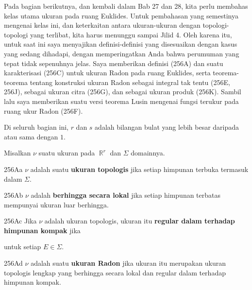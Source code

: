 
\def\chaptername{Ukuran produk}
\def\sectionname{Ukuran Radon pada $\BbbR^r$}


\def\headlinesectionname{Ukuran Radon pada {$\eightBbb R^r$}}

Pada bagian berikutnya, dan kembali dalam Bab 27 dan 28,
kita perlu membahas kelas utama ukuran pada ruang Euklides.
Untuk pembahasan yang semestinya mengenai kelas ini, dan keterkaitan
antara ukuran-ukuran dengan topologi-topologi yang terlibat, kita harus menunggu sampai
Jilid 4.   Oleh karena itu, untuk saat ini saya menyajikan definisi-definisi yang disesuaikan dengan
kasus yang sedang dihadapi, dengan memperingatkan Anda bahwa perumuman yang tepat tidak
sepenuhnya jelas.   Saya memberikan definisi (256A) dan suatu karakterisasi
(256C) untuk ukuran Radon pada ruang Euklides, serta teorema-teorema tentang
konstruksi
ukuran Radon sebagai integral tak tentu (256E, 256J), sebagai ukuran citra
(256G), dan sebagai ukuran produk (256K).   Sambil lalu saya memberikan suatu versi
teorema Lusin mengenai fungsi terukur pada ruang ukur Radon
(256F).

Di seluruh bagian ini, $r$ dan $s$ adalah bilangan bulat yang lebih besar daripada atau sama
dengan $1$.

 Misalkan $\nu$ suatu ukuran pada $\BbbR^r$
dan $\Sigma$ domainnya.

\spheader 256Aa $\nu$ adalah suatu {\bf ukuran topologis} jika setiap himpunan terbuka
termasuk dalam $\Sigma$.   

\spheader 256Ab $\nu$ adalah {\bf berhingga secara lokal} jika setiap himpunan terbatas mempunyai
ukuran luar berhingga.

\spheader 256Ac Jika $\nu$ adalah ukuran topologis, ukuran itu {\bf regular
dalam terhadap himpunan kompak} jika


\noindent untuk setiap $E\in\Sigma$.   

\spheader 256Ad $\nu$ adalah suatu {\bf ukuran Radon} jika ukuran itu merupakan ukuran topologis
lengkap yang berhingga secara lokal dan regular dalam terhadap
himpunan kompak.


